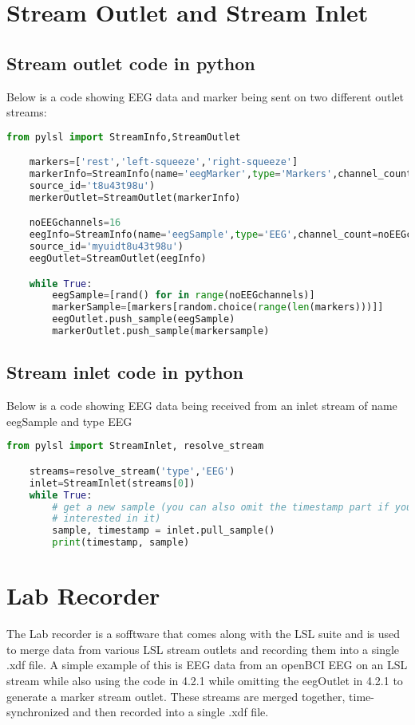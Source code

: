 \documentclass[16pt]{book}
\begin{document}
\section{Stream Outlet and Stream Inlet}
\subsection{Stream outlet code in python}
\par\noindent Below is a code showing EEG data and marker being sent on two different outlet streams:
\begin{lstlisting}[language=Python]
    from pylsl import StreamInfo,StreamOutlet

    markers=['rest','left-squeeze','right-squeeze']
    markerInfo=StreamInfo(name='eegMarker',type='Markers',channel_count=1,nominal_srate=0, channel_format='string',
    source_id='t8u43t98u')
    merkerOutlet=StreamOutlet(markerInfo)

    noEEGchannels=16
    eegInfo=StreamInfo(name='eegSample',type='EEG',channel_count=noEEGchannels,nominal_srate=250, channel_format='float32',
    source_id='myuidt8u43t98u')
    eegOutlet=StreamOutlet(eegInfo)

    while True:
        eegSample=[rand() for in range(noEEGchannels)]
        markerSample=[markers[random.choice(range(len(markers)))]]
        eegOutlet.push_sample(eegSample)
        markerOutlet.push_sample(markersample)
\end{lstlisting}
\subsection{Stream inlet code in python}
\par\noindent Below is a code showing EEG data being received from an inlet stream of name eegSample and type EEG
\begin{lstlisting}[language=python]
    from pylsl import StreamInlet, resolve_stream

    streams=resolve_stream('type','EEG')
    inlet=StreamInlet(streams[0])
    while True:
        # get a new sample (you can also omit the timestamp part if you're not
        # interested in it)
        sample, timestamp = inlet.pull_sample()
        print(timestamp, sample)
\end{lstlisting}
\section{Lab Recorder}
\par\noindent The Lab recorder is a sofftware that comes along with the LSL suite and is used to merge data from various 
LSL stream outlets and recording them into a single .xdf file. A simple example of this is EEG data from an openBCI EEG 
on an LSL stream while also using the code in 4.2.1 while omitting the eegOutlet in 4.2.1 to generate a marker stream outlet.
These streams are merged together, time-synchronized and then recorded into a single .xdf file. 
\end{document}
